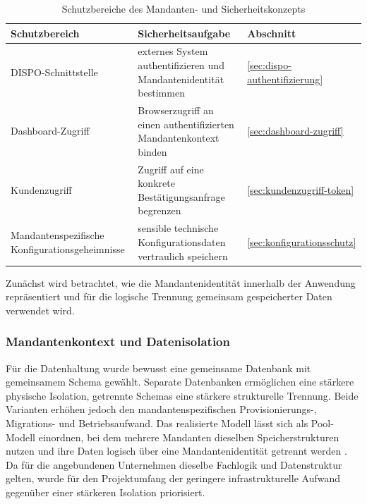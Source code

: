 \begin{table}[htbp]
  \centering
  \caption{Schutzbereiche des Mandanten- und Sicherheitskonzepts}
  \label{tab:schutzbereiche}
  \small
  \begin{tabularx}{\textwidth}{
      @{}
      >{\raggedright\arraybackslash}p{}
      >{\raggedright\arraybackslash}X
      >{\centering\arraybackslash}p{}
      @{}
    }
    \toprule
    Schutzbereich
      & Sicherheitsaufgabe
      & Abschnitt \\
    \midrule
    DISPO-Schnittstelle
      & externes System authentifizieren und Mandantenidentität bestimmen
      & \ref{sec:dispo-authentifizierung} \\
    Dashboard-Zugriff
      & Browserzugriff an einen authentifizierten Mandantenkontext binden
      & \ref{sec:dashboard-zugriff} \\
    Kundenzugriff
      & Zugriff auf eine konkrete Bestätigungsanfrage begrenzen
      & \ref{sec:kundenzugriff-token} \\
    Mandantenspezifische Konfigurationsgeheimnisse
      & sensible technische Konfigurationsdaten vertraulich speichern
      & \ref{sec:konfigurationsschutz} \\
    \bottomrule
  \end{tabularx}
\end{table}

Zunächst wird betrachtet, wie die Mandantenidentität innerhalb der Anwendung
repräsentiert und für die logische Trennung gemeinsam gespeicherter Daten
verwendet wird.

\subsubsection{Mandantenkontext und Datenisolation}
\label{sec:mandantenkontext}

Für die Datenhaltung wurde bewusst eine gemeinsame Datenbank mit gemeinsamem
Schema gewählt. Separate Datenbanken ermöglichen eine stärkere physische
Isolation, getrennte Schemas eine stärkere strukturelle Trennung. Beide
Varianten erhöhen jedoch den mandantenspezifischen Provisionierungs-,
Migrations- und Betriebsaufwand. Das realisierte Modell lässt sich als
Pool-Modell einordnen, bei dem mehrere Mandanten dieselben Speicherstrukturen
nutzen und ihre Daten logisch über eine Mandantenidentität getrennt werden
\parencite{aws2021partitioningModels}. Da für die
angebundenen Unternehmen dieselbe Fachlogik und Datenstruktur gelten, wurde für
den Projektumfang der geringere infrastrukturelle Aufwand gegenüber einer
stärkeren Isolation priorisiert.


